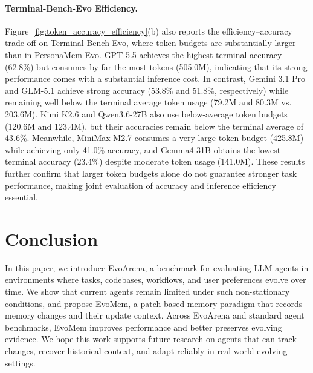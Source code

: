 \documentclass{llmxive}
\begin{document}
\paragraph{Terminal-Bench-Evo Efficiency.}
Figure~\ref{fig:token_accuracy_efficiency}(b) also reports the efficiency--accuracy trade-off on Terminal-Bench-Evo, where token budgets are substantially larger than in PersonaMem-Evo. GPT-5.5 achieves the highest terminal accuracy (62.8\%) but consumes by far the most tokens (505.0M), indicating that its strong performance comes with a substantial inference cost. In contrast, Gemini 3.1 Pro and GLM-5.1 achieve strong accuracy (53.8\% and 51.8\%, respectively) while remaining well below the terminal average token usage (79.2M and 80.3M vs. 203.6M). Kimi K2.6 and Qwen3.6-27B also use below-average token budgets (120.6M and 123.4M), but their accuracies remain below the terminal average of 43.6\%. Meanwhile, MiniMax M2.7 consumes a very large token budget (425.8M) while achieving only 41.0\% accuracy, and Gemma4-31B obtains the lowest terminal accuracy (23.4\%) despite moderate token usage (141.0M). These results further confirm that larger token budgets alone do not guarantee stronger task performance, making joint evaluation of accuracy and inference efficiency essential.



\section{Conclusion}










In this paper, we introduce EvoArena, a benchmark for evaluating LLM agents in environments where tasks, codebases, workflows, and user preferences evolve over time. We show that current agents remain limited under such non-stationary conditions, and propose EvoMem, a patch-based memory paradigm that records memory changes and their update context. Across EvoArena and standard agent benchmarks, EvoMem improves performance and better preserves evolving evidence. We hope this work supports future research on agents that can track changes, recover historical context, and adapt reliably in real-world evolving settings.







\end{document}
